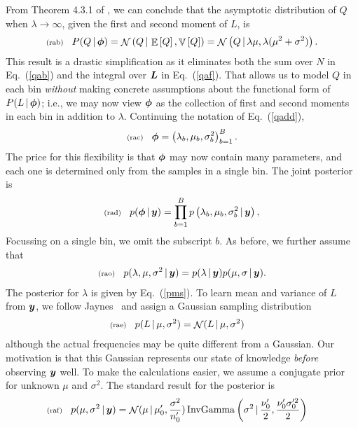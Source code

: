 \documentclass[11pt]{article}
\newcommand{\lleq}[1]{\label{#1} }
\renewcommand{\lleq}[1]{\label{#1} {\scriptstyle {\rm (#1)}} \hspace*{2ex} }
\newcommand{\cond}{\,|\,}
\newcommand{\refeq}[1]{Eq.~(\ref{#1})}
\DeclareMathOperator{\Expect}{\mathbb{E}}
\newcommand{\expect}[1]{\Expect\left[#1\right]}
\DeclareMathOperator{\GaussianDist}{\mathcal{N}}
\DeclareMathOperator{\InvGammaDist}{InvGamma}
\newcommand{\Lumtot}{Q}
\newcommand{\Lum}{L}
\DeclareMathOperator{\Variance}{\mathbb{V}}
\newcommand{\variance}[1]{\Variance\left[#1\right]}
\begin{document}
From Theorem 4.3.1 of \cite{bening2002generalized}, we can conclude
that the asymptotic distribution of $\Lumtot$ when
$\lambda \to \infty$, given the first and second moment of $\Lum$, is
\begin{align}
  \lleq{rab}
  P(\Lumtot \cond \bmphi) = \GaussianDist \left( \Lumtot \cond \expect{Q}, \variance{Q} \right) = \GaussianDist \left( \Lumtot \cond \lambda \mu, \lambda (\mu^2 + \sigma^2) \right).
\end{align}
This result is a drastic simplification as it eliminates both the sum over $N$ in \refeq{qab} and the integral over ${\bm{L}}$ in \refeq{qaf}.
That allows us to model $\Lumtot$ in each bin \emph{without} making concrete
assumptions about the functional form of $P(\Lum \cond \bmphi)$; i.e., we may now view ${\bm{\phi}}$ as the collection of first and second moments in each bin in addition to $\lambda$. Continuing the notation of \refeq{qadd},
\begin{align}
  \lleq{rac}
  \bmphi =  \left(\lambda_b, \mu_b, \sigma^2_b \right)_{b=1}^B.
\end{align}
The price for this flexibility is that ${\bm{\phi}}$ may now contain many
parameters, and each one is determined only from the samples in a
single bin. The joint posterior is
\begin{align}
  \lleq{rad}
  p(\bmphi \cond \bmy ) = \prod_{b=1}^B p\left(\lambda_b, \mu_b, \sigma^2_b \cond \bmy\right),
\end{align}
Focussing on a single bin, we omit the subscript $b$. As before, we
further assume that
\begin{align}
  \lleq{rao}
p(\lambda, \mu, \sigma^2 \cond \bmy) = p(\lambda \cond \bmy) p(\mu,
\sigma \cond \bmy).
\end{align}
The posterior for $\lambda$ is given by \refeq{pms}.  To learn mean
and variance of $\Lum$ from ${\bm{y}}$, we follow
Jaynes~\cite[Ch. 7.10]{jaynes2003probability} and assign a Gaussian
sampling distribution
\begin{align}
  \lleq{rae}
  p(\Lum \cond \mu, \sigma^2 ) &= \GaussianDist(\Lum \cond \mu, \sigma^2)
\end{align}
although the actual frequencies may be quite different from a
Gaussian. Our motivation is that this Gaussian represents our state of
knowledge \emph{before} observing ${\bm{y}}$ well. To make the
calculations easier, we assume a conjugate prior for unknown $\mu$ and
$\sigma^2$. The standard result for the posterior is
\begin{align}
  \lleq{raf}
  p(\mu, \sigma^2 \cond \bmy) &= \GaussianDist(\mu \cond \mu_0^\prime, \frac{\sigma^2}{n_0^\prime}) \InvGammaDist\left( \sigma^2 \cond \frac{\nu_0^\prime}{2}, \frac{\nu_0^\prime \sigma_0^{\prime 2}}{2} \right)
\end{align}
\end{document}
